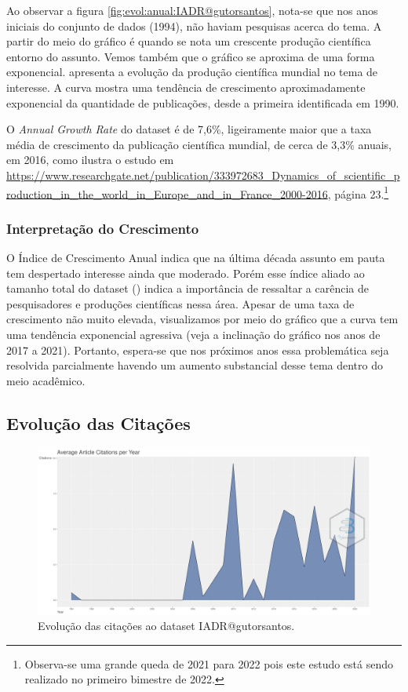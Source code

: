Ao observar a figura \ref{fig:evol:anual:IADR@gutorsantos}, nota-se que nos anos iniciais do conjunto de dados (1994), não haviam pesquisas acerca do tema. A partir do meio do gráfico é quando se nota um crescente produção científica entorno do assunto. Vemos também que o gráfico se aproxima de uma forma exponencial. 
apresenta a evolução da produção científica mundial no tema de interesse. A curva mostra uma tendência de crescimento aproximadamente exponencial da quantidade de publicações, desde a primeira identificada em 1990.

O \textit{Annual Growth Rate} do dataset é de 7,6\%, ligeiramente maior que a taxa média de crescimento da publicação científica mundial, de cerca de 3,3\% anuais, em 2016, como ilustra o estudo em \url{https://www.researchgate.net/publication/333972683_Dynamics_of_scientific_production_in_the_world_in_Europe_and_in_France_2000-2016}, página 23.\footnote{Observa-se uma grande queda de 2021 para 2022 pois este estudo está sendo realizado no primeiro bimestre de 2022.}

\subsubsection{Interpretação do Crescimento} 

O Índice de Crescimento Anual indica que na última década assunto em pauta tem despertado interesse ainda que moderado. Porém esse índice aliado ao tamanho total do dataset (\totalDocuments{}) indica a importância de ressaltar a carência de pesquisadores e produções científicas nessa área. Apesar de uma taxa de crescimento não muito elevada, visualizamos por meio do gráfico que a curva tem uma tendência exponencial agressiva (veja a inclinação do gráfico nos anos de 2017 a 2021). Portanto, espera-se que nos próximos anos essa problemática seja resolvida parcialmente havendo um aumento substancial desse tema dentro do meio acadêmico.

\subsection{Evolução das Citações}
\label{sec:IADR@gutorsantos:Citations}

\begin{figure}[H]
    \centering
    \includegraphics[width=1\textwidth]{experiments/gutorsantos/AnaliseBibliometrica/IAeDiscriminacao/imgs/AverageArticleCitationPerYear-2022-02-09.png}
    \caption{Evolução das citações ao dataset IADR@gutorsantos.}
    \label{fig:evol:anual:citacoes:IADR@gutorsantos}
\end{figure}

